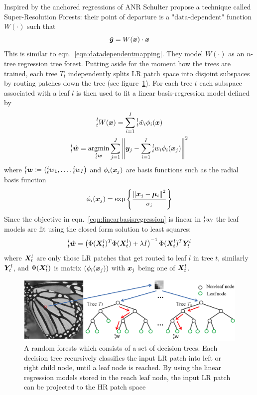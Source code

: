 Inspired by the anchored regressions of ANR Schulter \etal\cite{Schulter2015} propose a technique called Super-Resolution Forests: their point of departure is a "data-dependent" function $W(\cdot)$ such that
\begin{equation}
    \hat{\bm{y}} = W(\bm{x}) \cdot \bm{x}
\end{equation}
This is similar to eqn.~\ref{eqn:datadependentmapping}.
%
They model $W(\cdot)$ as an $n$-tree regression tree forest.
%
Putting aside for the moment how the trees are trained, each tree $T_t$ independently splits LR patch space into disjoint subspaces by routing patches down the tree (see figure~\ref{fig:firf}).
%
For each tree $t$ each subspace associated with a leaf $l$ is then used to fit a linear basis-regression model defined by
\begin{gather}
    \prescript{l}{t}{W(\bx)} = \sum_{i=1}^I \prescript{l}{t}{\hat{w}_i}\phi_i(\bx) \\
    \prescript{l}{t}{\hat{\bm{w}}} = \underset{\prescript{l}{t}{\bm{w}}}{\text{argmin}} \sum_{j=1}^J \left\| \by_j - \sum_{i=1}^I \prescript{l}{t}{w_i}\phi_i(\bx_j) \right\|^2
    \label{eqn:linearbasisregression}
\end{gather}
where $\prescript{l}{t}{\bm{w}} \coloneqq \left( \prescript{l}{t}{w}_1, \mathellipsis, \prescript{l}{t}{w}_I \right)$ and $\phi_i(\bm{x}_j)$ are basis functions such as the radial basis function
\begin{equation}
    \phi_i(\bm{x}_j) = \exp \left\{ \frac{\left\| \bm{x}_j - \bm{\mu}_i \right\|^2}{\sigma_i} \right\}
\end{equation}
Since the objective in eqn.~\ref{eqn:linearbasisregression} is linear in $\prescript{l}{t}{w}_i$ the leaf models are fit using the closed form solution to least squares:
\begin{equation}
    \prescript{l}{t}{\hat{\bm{w}}} = \left( \Phi(\bm{X}_t^l)^T \Phi(\bm{X}_t^l) + \lambda I \right)^{-1} \Phi(\bm{X}_t^l)^T \bm{Y}_t^l
\end{equation}
where $\bm{X}_t^l$ are only those LR patches that get routed to leaf $l$ in tree $t$, similarly $\bm{Y}_t^l$, and $\Phi(\bm{X}_t^l)$ is matrix $\left( \phi_i(\bm{x}_j) \right)$ with $\bm{x}_j$ being one of $\bm{X}_t^l$.
%
\begin{figure}
    \centering
    \includegraphics[width=\linewidth,keepaspectratio]{figures/FIRF.png}
    \caption{A random forests which consists of a set of decision trees. Each decision tree recursively classifies the input LR patch into left or right child node, until a leaf node is reached. By using the linear regression models stored in the reach leaf node, the input LR patch can be projected to the HR patch space\cite{Huang}}
    \label{fig:firf}
\end{figure}

